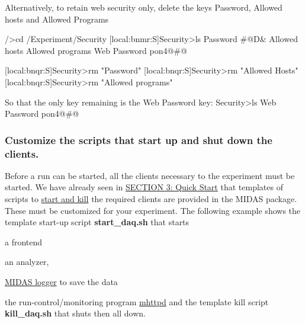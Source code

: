 Alternatively, to retain web security only, delete the keys Password, Allowed hosts and Allowed Programs 
\begin{DoxyCode}
  [local]/>cd /Experiment/Security
[local:bnmr:S]Security>ls
Password                        #@D&%
Allowed hosts
Allowed programs
Web Password                    pon4@#@%

[local:bnqr:S]Security>rm "Password"
[local:bnqr:S]Security>rm "Allowed Hosts"
[local:bnqr:S]Security>rm "Allowed programs"
\encode

So that the only key remaining is the Web Password key:
Security>ls
Web Password                    pon4@#@%
\end{DoxyCode}


\par
 

 \par
\hypertarget{RC_customize_ODB_RC_starting_clients}{}\subsubsection{Customize the scripts that start up and shut down the clients.}\label{RC_customize_ODB_RC_starting_clients}
\label{RC_customize_ODB_idx_startup_script}
\hypertarget{RC_customize_ODB_idx_startup_script}{}
 \label{RC_customize_ODB_idx_shutdown_script}
\hypertarget{RC_customize_ODB_idx_shutdown_script}{}
 Before a run can be started, all the clients necessary to the experiment must be started. We have already seen in \hyperlink{Quickstart}{SECTION 3: Quick Start} that templates of scripts to \hyperlink{RC_customize_ODB_start-all}{start and kill} the required clients are provided in the MIDAS package. These must be customized for your experiment. The following example shows the template start-\/up script {\bfseries start\_\-daq.sh} that starts
\begin{DoxyItemize}
\item a frontend
\item an analyzer,
\item \hyperlink{F_Logging_F_mlogger_utility}{MIDAS logger} to save the data
\item the run-\/control/monitoring program \hyperlink{RC_mhttpd_utility}{mhttpd} and the template kill script {\bfseries kill\_\-daq.sh} that shuts then all down.
\end{DoxyItemize}


